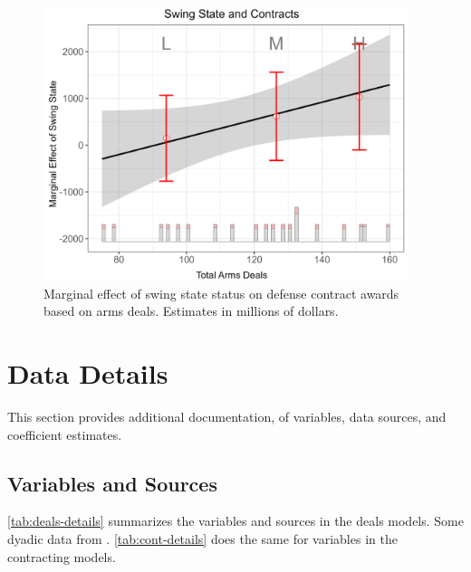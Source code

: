 \documentclass[12pt]{article}
\begin{document}
\begin{figure}[htpb]
	\centering
		\includegraphics[width=0.95\textwidth]{swing-cont-bin.png}
	\caption{Marginal effect of swing state status on defense contract awards based on arms deals. Estimates in millions of dollars.}
	\label{fig:swing-cont-bin}
\end{figure}


\newpage

\section{Data Details}
\afterpage{\clearpage}
This section provides additional documentation, of variables, data sources, and coefficient estimates.  

%



\subsection{Variables and Sources}

\autoref{tab:deals-details} summarizes the variables and sources in the deals models. Some dyadic data from \citet{peacesciencer-package}. 
\autoref{tab:cont-details} does the same for variables in the contracting models. 
\end{document}

